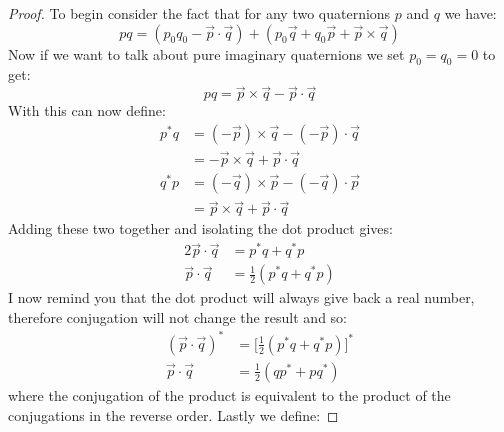 \documentclass[12pt, letterpaper, onecolumn, conference, final]{IEEEtran}
\theoremstyle{definition}
\theoremstyle{plain}
\begin{document}
\begin{proof}
To begin consider the fact that for any two quaternions $p$ and $q$ we have:
\begin{equation*}
pq = (p_0q_0 - \overrightarrow{p} \cdot \overrightarrow{q}) + (p_0\overrightarrow{q} + q_0\overrightarrow{p} + \overrightarrow{p} \times \overrightarrow{q})
\end{equation*}
Now if we want to talk about pure imaginary quaternions we set $p_0 = q_0 = 0$ to get:
\begin{equation*}
pq = \overrightarrow{p} \times \overrightarrow{q} - \overrightarrow{p} \cdot \overrightarrow{q}
\end{equation*}
With this can now define:
\begin{equation*}
\begin{split}
p^*q &= (-\overrightarrow{p}) \times \overrightarrow{q} - (-\overrightarrow{p}) \cdot \overrightarrow{q} \\
&= -\overrightarrow{p} \times \overrightarrow{q} + \overrightarrow{p} \cdot \overrightarrow{q} \\
q^*p &= (-\overrightarrow{q}) \times \overrightarrow{p} - (-\overrightarrow{q}) \cdot \overrightarrow{p} \\
&= \overrightarrow{p} \times \overrightarrow{q} + \overrightarrow{p} \cdot \overrightarrow{q}
\end{split}
\end{equation*}
Adding these two together and isolating the dot product gives:
\begin{equation*}
\begin{split}
2\overrightarrow{p} \cdot \overrightarrow{q} &= p^*q + q^*p \\
\overrightarrow{p} \cdot \overrightarrow{q} &= \frac{1}{2}(p^*q + q^*p)
\end{split}
\end{equation*}
I now remind you that the dot product will always give back a real number, therefore conjugation will not change the result and so:
\begin{equation*}
\begin{split}
(\overrightarrow{p} \cdot \overrightarrow{q})^* &= \Big[ \frac{1}{2}(p^*q + q^*p) \Big]^* \\
\overrightarrow{p} \cdot \overrightarrow{q} &= \frac{1}{2}(qp^* + pq^*)
\end{split}
\end{equation*}
where the conjugation of the product is equivalent to the product of the conjugations in the reverse order. Lastly we define:

\end{proof}
\end{document}
